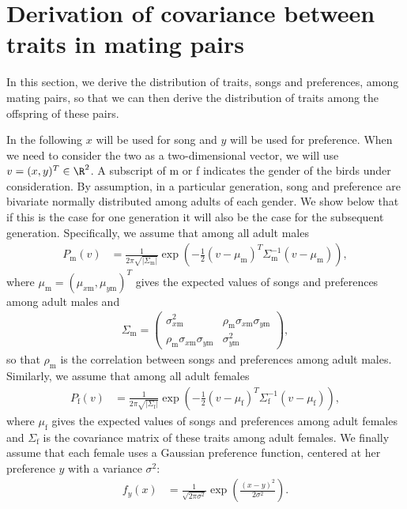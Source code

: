 \documentclass{article}
\newcommand{\x}[1]{\text{#1}}
\begin{document}
\tableofcontents



\section{Derivation of covariance between traits in mating pairs \label{cov_derivation}}
In this section, we derive the distribution of traits, songs and preferences, among mating pairs, so that we can then derive the distribution of traits among the offspring of these pairs. 

In the following $x$ will be used for song and $y$ will be used for preference. When we need to consider the two as a two-dimensional vector, we will use $v=(x,y)^T\in\R^2$. A subscript of m or f indicates the gender of the birds under consideration. By assumption, in a particular generation, song and preference are bivariate normally distributed among adults of each gender. We show below that if this is the case for one generation it will also be the case for the subsequent generation. Specifically, we assume that among all adult males
\begin{align*}
P_\x{m}(v)&=\frac{1}{2\pi\sqrt{|\Sigma_\x{m}|}}\exp\left(-\frac{1}{2}(v-\mu_\x{m})^T\Sigma_\x{m}^{-1}(v-\mu_\x{m})\right),
\end{align*} where $\mu_\x{m}=(\mu_{x\x{m}},\mu_{y\x{m}})^T$ gives the expected values of songs and preferences among adult males and 
\begin{align*}
\Sigma_{\x{m}}=\left(\begin{array}{cc}\sigma_{x\x{m}}^2 & \rho_\x{m}\sigma_{x\x{m}}\sigma_{y\x{m}} \\ \rho_\x{m}\sigma_{x\x{m}}\sigma_{y\x{m}} & \sigma_{y\x{m}}^2 \end{array}\right),
\end{align*}
so that $\rho_\x{m}$ is the correlation between songs and preferences among adult males. Similarly, we assume that among all adult females 
\begin{align*}
P_\x{f}(v)&=\frac{1}{2\pi\sqrt{|\Sigma_\x{f}|}}\exp\left(-\frac{1}{2}(v-\mu_\x{f})^T\Sigma_\x{f}^{-1}(v-\mu_\x{f})\right), 
\end{align*}
where $\mu_\x{f}$ gives the expected values of songs and preferences among adult females and $\Sigma_\x{f}$ is the covariance matrix of these traits among adult females. We finally assume that each female uses a Gaussian preference function, centered at her preference $y$ with a variance $\sigma^2$:
\begin{align*}
f_y(x)&=\frac{1}{\sqrt{2\pi\sigma^2}}\exp\left(\frac{(x-y)^2}{2\sigma^2}\right).
\end{align*}
\end{document}
